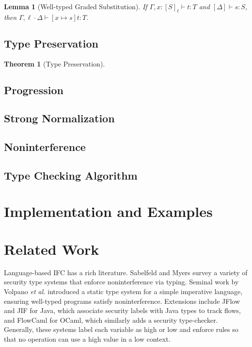 \documentclass[conference]{IEEEtran}
\newtheorem{theorem}{Theorem}
\newtheorem{lemma}{Lemma}
\begin{document}
\begin{lemma}[Well-typed Graded Substitution] 
	If $\Gamma,x:[S]_\ell\vdash t:T$ and $[\Delta]\vdash s:S$, then $\Gamma,\ell\cdot\Delta\vdash [x\mapsto s]t:T$.
\end{lemma}

\subsection{Type Preservation}
\label{thm-pre}
\begin{theorem}[Type Preservation]
	
\end{theorem}

\subsection{Progression}

\subsection{Strong Normalization}

\subsection{Noninterference}

\subsection{Type Checking Algorithm}

\section{Implementation and Examples}

\section{Related Work}

Language-based IFC has a rich literature. Sabelfeld and Myers \cite{sabelfeld2003language} survey a variety of security type systems that enforce noninterference via typing. Seminal work by Volpano \emph{et al.} \cite{volpano1996sound} introduced a static type system for a simple imperative language, ensuring well-typed programs satisfy noninterference. Extensions include JFlow \cite{myers1999jflow} and JIF \cite{pullicino2014jif} for Java, which associate security labels with Java types to track flows, and FlowCaml \cite{simonet2003flow} for OCaml, which similarly adds a security type-checker. Generally, these systems label each variable as high or low and enforce rules so that no operation can use a high value in a low context.
\end{document}
